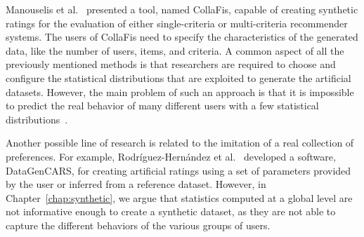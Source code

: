 Manouselis et al.~\cite{Manouselis2008} presented a tool, named CollaFis, capable of creating synthetic ratings for the evaluation of either single-criteria or multi-criteria recommender systems. The users of CollaFis need to specify the characteristics of the generated data, like the number of users, items, and criteria. A common aspect of all the previously mentioned methods is that researchers are required to choose and configure the statistical distributions that are exploited to generate the artificial datasets. However, the main problem of such an approach is that it is impossible to predict the real behavior of many different users with a few statistical distributions~\cite{Montaner2004}.

Another possible line of research is related to the imitation of a real collection of preferences. For example, Rodr{\'i}guez-Hern{\'a}ndez et al.~\cite{CarmenRodriguez-Hernandez2017} developed a software, DataGenCARS, for creating artificial ratings using a set of parameters provided by the user or inferred from a reference dataset. However, in Chapter~\ref{chap:synthetic}, we argue that statistics computed at a global level are not informative enough to create a synthetic dataset, as they are not able to capture the different behaviors of the various groups of users.
